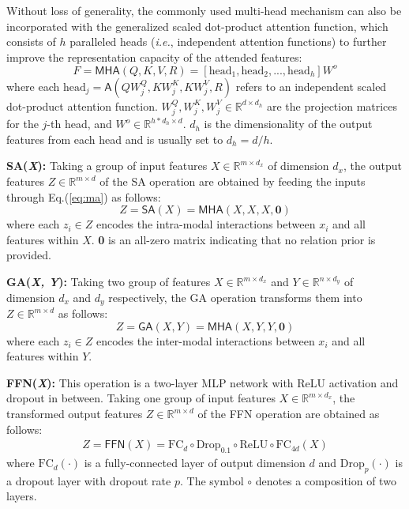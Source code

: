 \documentclass[sigconf]{acmart}
\begin{document}
Without loss of generality, the commonly used multi-head mechanism \cite{vaswani2017attention} can also be incorporated with the generalized scaled dot-product attention function, which consists of $h$ paralleled heads (\emph{i.e.}, independent attention functions) to further improve the representation capacity of the attended features:
\begin{equation}\label{eq:ma}
F = \textsf{MHA}(Q,K,V,R)=[\mathrm{head}_1,\mathrm{head}_2,...,\mathrm{head}_h]W^o
\end{equation}
where each $\mathrm{head}_j=\textsf{A}(QW_j^Q,KW_j^K,KW_j^V, R)$ refers to an independent scaled dot-product attention function. $W_j^Q, W_j^K, W_j^V \in\mathbb{R}^{d \times d_h}$ are the projection matrices for the $j$-th head, and $W^o\in\mathbb{R}^{h*d_h \times d}$. $d_h$ is the dimensionality of the output features from each head and is usually set to $d_h=d/h$.

\noindent\textbf{SA(\textit{X}):} Taking a group of input features $X\in\mathbb{R}^{m \times d_x}$ of dimension $d_x$, the output features $Z\in\mathbb{R}^{m \times d}$ of the \textsf{SA} operation are obtained by feeding the inputs through Eq.(\ref{eq:ma}) as follows:
\begin{equation}\label{eq:sa}
Z = \textsf{SA}(X) = \textsf{MHA}(X, X, X, \textbf{0})
\end{equation}
where each $z_i\in Z$ encodes the intra-modal interactions between $x_i$ and all features within $X$. \textbf{0} is an all-zero matrix indicating that no relation prior is provided.

\noindent\textbf{GA(\textit{X, Y}):} Taking two group of features $X\in\mathbb{R}^{m\times d_x}$ and  $Y\in\mathbb{R}^{n\times d_y}$ of dimension $d_x$ and $d_y$ respectively, the \textsf{GA} operation transforms them into $Z\in\mathbb{R}^{m \times d}$ as follows:
\begin{equation}\label{eq:ga}
Z = \textsf{GA}(X, Y) = \textsf{MHA}(X, Y, Y, \textbf{0})
\end{equation}
where each $z_i\in Z$ encodes the inter-modal interactions between $x_i$ and all features within $Y$.

\noindent\textbf{FFN(\textit{X}):} This operation is a two-layer MLP network with ReLU activation and dropout in between. Taking one group of input features $X\in\mathbb{R}^{m \times d_x}$, the transformed output features $Z\in\mathbb{R}^{m \times d}$ of the \textsf{FFN} operation are obtained as follows:
\begin{equation}\label{eq:ffn}
\begin{aligned}
Z= \textsf{FFN}(X) = \mathrm{FC}_{d}\circ\mathrm{Drop}_{0.1}\circ\mathrm{ReLU}\circ\mathrm{FC}_{4d}(X)
\end{aligned}
\end{equation}
where $\mathrm{FC}_{d}(\cdot)$ is a fully-connected layer of output dimension $d$ and $\mathrm{Drop}_{p}(\cdot)$ is a dropout layer with dropout rate $p$. The symbol $\circ$ denotes a composition of two layers.
\end{document}
